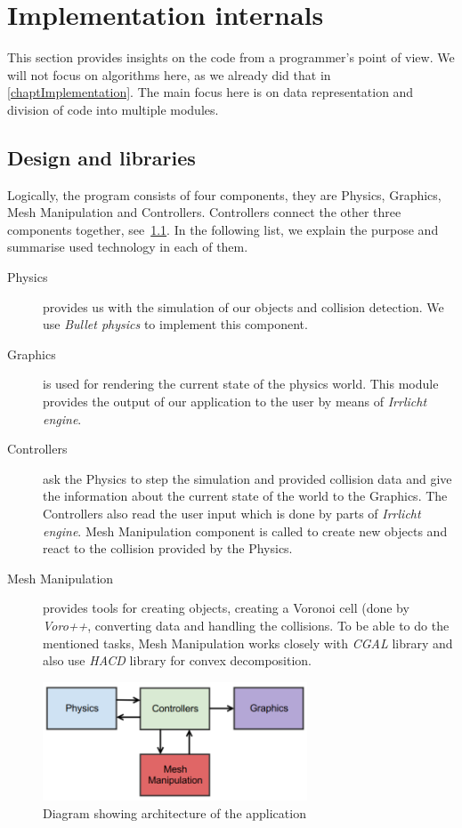 \chapter{Implementation internals}
\label{app:implementation}

This section provides insights on the code from a programmer's point of view. We will not focus on algorithms here, as we already did that in \cref{chaptImplementation}. The main focus here is on data representation and division of code into multiple modules.

\section{Design and libraries}
Logically, the program consists of four components, they are Physics, Graphics, Mesh Manipulation and Controllers. Controllers connect the other three components together, see~\cref{fig:architecture}. In the following list, we explain the purpose and summarise used technology in each of them.
\begin{description}
\item[Physics] provides us with the simulation of our objects and collision detection. We use \emph{Bullet physics} to implement this component. 
\item[Graphics] is used for rendering the current state of the physics world. This module provides the output of our application to the user by means of \emph{Irrlicht engine}.
\item[Controllers] ask the Physics to step the simulation and provided collision data and give the information about the current state of the world to the Graphics. The Controllers also read the user input which is done by parts of \emph{Irrlicht engine}. Mesh Manipulation component is called to create new objects and react to the collision provided by the Physics.
\item[Mesh Manipulation] provides tools for creating objects, creating a Voronoi cell (done by \emph{Voro++}, converting data and handling the collisions. To be able to do the mentioned tasks, Mesh Manipulation works closely with \emph{CGAL} library and also use \emph{HACD} library for convex decomposition.
\end{description}

\begin{figure}
        \centering
        \includegraphics[width=0.7\textwidth]{img/architecture}
        \caption{Diagram showing architecture of the application}
        \label{fig:architecture}
\end{figure}


